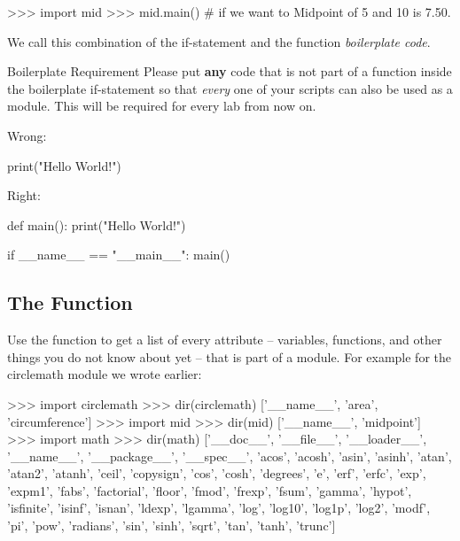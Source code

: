 \documentclass[11pt]{cselabheader}
\begin{document}
\begin{pyconcode}
>>> import mid
>>> mid.main() # if we want to
Midpoint of 5 and 10 is 7.50.
\end{pyconcode}


We call this combination of the if-statement and the
 function \emph{boilerplate code}.

\begin{infobox}{Boilerplate Requirement}
  Please put \textbf{any} code that is not part of a function inside the
  boilerplate if-statement so that \emph{every} one of your scripts can also be
  used as a module. This will be required for every lab from now on.

  Wrong:

  \begin{python3code}
print("Hello World!")
  \end{python3code}

  Right:

  \begin{python3code}
def main():
    print("Hello World!")

if __name__ == "__main__":
    main()
  \end{python3code}
\end{infobox}

\subsection{The \protect{} Function}

Use the  function to get a list of every attribute --
variables, functions, and other things you do not know about yet -- that is part
of a module. For example for the circlemath module we wrote earlier:

\begin{pyconcode}
>>> import circlemath
>>> dir(circlemath)
['__name__', 'area', 'circumference']
>>> import mid
>>> dir(mid)
['__name__', 'midpoint']
>>> import math
>>> dir(math)
['__doc__', '__file__', '__loader__', '__name__', '__package__', '__spec__', 'acos',
'acosh', 'asin', 'asinh', 'atan', 'atan2', 'atanh', 'ceil', 'copysign', 'cos', 'cosh',
'degrees', 'e', 'erf', 'erfc', 'exp', 'expm1', 'fabs', 'factorial', 'floor', 'fmod',
'frexp', 'fsum', 'gamma', 'hypot', 'isfinite', 'isinf', 'isnan', 'ldexp', 'lgamma',
'log', 'log10', 'log1p', 'log2', 'modf', 'pi', 'pow', 'radians', 'sin', 'sinh', 'sqrt',
'tan', 'tanh', 'trunc']
\end{pyconcode}
\end{document}

